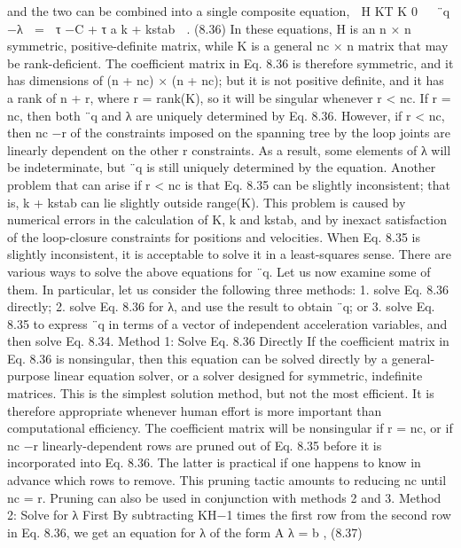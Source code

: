 and the two can be combined into a single composite equation,  H KT K 0   ¨q −λ  =  τ −C + τ a k + kstab  . (8.36) In these equations, H is an n × n symmetric, positive-definite matrix, while K is a general nc × n matrix that may be rank-deficient. The coefficient matrix in Eq. 8.36 is therefore symmetric, and it has dimensions of (n + nc) × (n + nc); but it is not positive definite, and it has a rank of n + r, where r = rank(K), so it will be singular whenever r < nc. If r = nc, then both ¨q and λ are uniquely determined by Eq. 8.36. However, if r < nc, then nc −r of the constraints imposed on the spanning tree by the loop joints are linearly dependent on the other r constraints. As a result, some elements of λ will be indeterminate, but ¨q is still uniquely determined by the equation. Another problem that can arise if r < nc is that Eq. 8.35 can be slightly inconsistent; that is, k + kstab can lie slightly outside range(K). This problem is caused by numerical errors in the calculation of K, k and kstab, and by inexact satisfaction of the loop-closure constraints for positions and velocities. When Eq. 8.35 is slightly inconsistent, it is acceptable to solve it in a least-squares sense. There are various ways to solve the above equations for ¨q. Let us now examine some of them. In particular, let us consider the following three methods: 1. solve Eq. 8.36 directly; 2. solve Eq. 8.36 for λ, and use the result to obtain ¨q; or 3. solve Eq. 8.35 to express ¨q in terms of a vector of independent acceleration variables, and then solve Eq. 8.34. Method 1: Solve Eq. 8.36 Directly If the coefficient matrix in Eq. 8.36 is nonsingular, then this equation can be solved directly by a general-purpose linear equation solver, or a solver designed for symmetric, indefinite matrices. This is the simplest solution method, but not the most efficient. It is therefore appropriate whenever human effort is more important than computational efficiency. The coefficient matrix will be nonsingular if r = nc, or if nc −r linearly-dependent rows are pruned out of Eq. 8.35 before it is incorporated into Eq. 8.36. The latter is practical if one happens to know in advance which rows to remove. This pruning tactic amounts to reducing nc until nc = r. Pruning can also be used in conjunction with methods 2 and 3. Method 2: Solve for λ First By subtracting KH−1 times the first row from the second row in Eq. 8.36, we get an equation for λ of the form A λ = b , (8.37)

